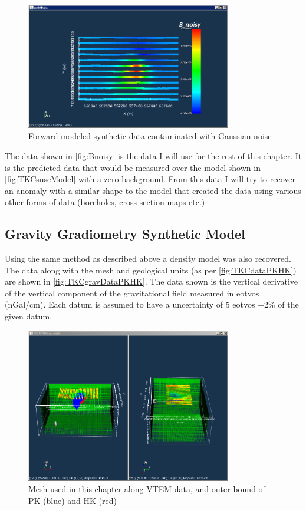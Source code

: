 \begin{figure} [h]
   \centering
   \includegraphics[width=0.8\textwidth]{images/TKC/Bnoisy.PNG}
   \caption{Forward modeled synthetic data contaminated with Gaussian noise}
   \label{fig:Bnoisy}
\end{figure}

The data shown in \autoref{fig:Bnoisy} is the data I will use for the rest of this chapter. It is the predicted data that would be measured over the model shown in \autoref{fig:TKCsuscModel} with a zero background. From this data I will try to recover an anomaly with a similar shape to the model that created the data using various other forms of data (boreholes, cross section maps etc.)

\subsection{Gravity Gradiometry Synthetic Model }
\label{subsec:Synthetic Model:GG:TKC}

Using the same method as described above a density model was also recovered. The data along with the mesh and geological units (as per \autoref{fig:TKCdataPKHK}) are shown in \autoref{fig:TKCgravDataPKHK}. The data shown is the vertical derivative of the vertical component of the gravitational field measured in  eotvos (nGal/cm). Each datum is assumed to have a uncertainty of 5 eotvos +2\% of the given datum.

\begin{figure} [h]
   \centering
   \includegraphics[width=0.8\textwidth]{images/TKC/TKCgravDataPKHK.PNG}
   \caption{Mesh used in this chapter along VTEM data, and outer bound of PK (blue) and HK (red)}
   \label{fig:TKCgravDataPKHK}
\end{figure}

